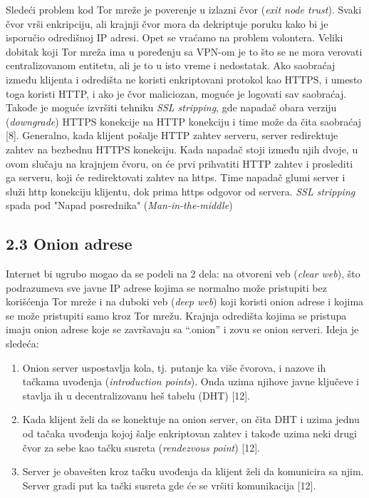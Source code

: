 \documentclass[
]{article}
\begin{document}
Sledeći problem kod Tor mreže je
poverenje u izlazni čvor (\emph{exit node trust}). Svaki čvor vrši enkripciju, ali krajnji čvor
mora da dekriptuje poruku kako bi je isporučio odredišnoj IP adresi.
Opet se vraćamo na problem volontera. Veliki dobitak koji Tor mreža ima
u poređenju sa VPN-om je to što se ne mora verovati centralizovanom
entitetu, ali je to u isto vreme i nedostatak. Ako saobraćaj između
klijenta i odredišta ne koristi enkriptovani protokol kao HTTPS, i
umesto toga koristi HTTP, i ako je čvor maliciozan, moguće je logovati
sav saobraćaj. Takođe je moguće izvršiti tehniku 
\emph{SSL stripping}, gde napadač obara verziju (\emph{downgrade}) HTTPS konekcije na
HTTP konekciju i time može da čita saobraćaj [8]. Generalno, kada klijent pošalje HTTP zahtev serveru, server redirektuje zahtev na bezbednu HTTPS konekciju. Kada napadač stoji između njih dvoje, u ovom slučaju na krajnjem čvoru, on će prvi prihvatiti HTTP zahtev i proslediti ga serveru, koji će redirektovati zahtev na https. Time napadač glumi server i služi http konekciju klijentu, dok prima https odgovor od servera. \emph{SSL stripping} spada pod  "Napad posrednika" (\emph{Man-in-the-middle})

\subsection{2.3 Onion adrese}
\label{sec:t2.3}

Internet bi ugrubo mogao da se podeli na 2 dela: na otvoreni veb (\emph{clear web}), što
podrazumeva sve javne IP adrese kojima se normalno može pristupiti bez
korišćenja Tor mreže i na duboki veb (\emph{deep web}) koji koristi onion adrese i kojima se
može pristupiti samo kroz Tor mrežu. Krajnja odredišta kojima se
pristupa imaju onion adrese koje se završavaju sa ``.onion'' i zovu se
onion serveri. Ideja je sledeća:

\begin{enumerate}
\def\labelenumi{\arabic{enumi}.}
\item
  Onion server uspostavlja kola, tj. putanje ka više čvorova, i nazove
  ih tačkama uvođenja (\emph{introduction points}). Onda uzima njihove javne ključeve i stavlja ih
  u decentralizovanu heš tabelu (DHT) [12].
\item
  Kada klijent želi da se konektuje na onion server, on čita DHT
  i uzima jednu od tačaka uvođenja kojoj šalje enkriptovan zahtev i
  takođe uzima neki drugi čvor za sebe kao tačku susreta (\emph{rendezvous point}) [12].
\item
  Server je obavešten kroz tačku uvođenja da klijent želi da
  komunicira sa njim. Server gradi put ka tački susreta gde će se
  vršiti komunikacija [12].
\end{enumerate}
\end{document}
